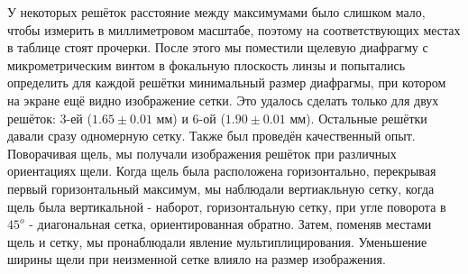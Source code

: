 \n
У некоторых решёток расстояние между максимумами было слишком мало, чтобы измерить в миллиметровом масштабе, поэтому на соответствующих местах в таблице стоят прочерки.
\n\n
После этого мы поместили щелевую диафрагму с микрометрическим винтом в фокальную плоскость линзы и попытались определить для каждой решётки минимальный размер диафрагмы, при котором на экране ещё видно изображение сетки. Это удалось сделать только для двух решёток: 3-ей ($1.65 \pm 0.01$ мм) и 6-ой ($1.90 \pm 0.01$ мм). Остальные решётки давали сразу одномерную сетку.
\n\n
Также был проведён качественный опыт. Поворачивая щель, мы получали изображения решёток при различных ориентациях щели. Когда щель была расположена горизонтально, перекрывая первый горизонтальный максимум, мы наблюдали вертиакльную сетку, когда щель была вертикальной - наборот, горизонтальную сетку, при угле поворота в $45^o$ - диагональная сетка, ориентированная обратно.
\n\n
Затем, поменяв местами щель и сетку, мы пронаблюдали явление мультиплицирования. Уменьшение ширины щели при неизменной сетке влияло на размер изображения.
